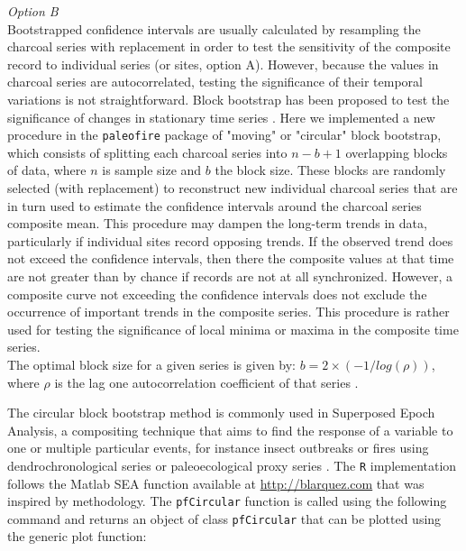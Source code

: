 \documentclass{elsarticle}
\begin{document}

\textit{Option B}\\
Bootstrapped confidence intervals are usually calculated by resampling the charcoal series with replacement in order to test the sensitivity of the composite record to individual series (or sites, option A). However, because the values in charcoal series are autocorrelated, testing the significance of their temporal variations is not straightforward. Block bootstrap has been proposed to test the significance of changes in stationary time series \citep{Kunsch1989}. Here we implemented a new procedure in the \texttt{paleofire} package of "moving" or "circular" block bootstrap, which consists of splitting each charcoal series into $n-b+1$ overlapping blocks of data, where $n$ is sample size and $b$ the block size. These blocks are randomly selected (with replacement) to reconstruct new individual charcoal series that are in turn used to estimate the confidence intervals around the charcoal series composite mean. This procedure may dampen the long-term trends in data, particularly if individual sites record opposing trends. If the observed trend does not exceed the confidence intervals, then there the composite values at that time are not greater than by chance if records are not at all synchronized. However, a composite curve not exceeding the confidence intervals does not exclude the occurrence of important trends in the composite series. This procedure is rather used for testing the significance of local minima or maxima in the composite time series. \\
The optimal block size for a given series is given by: $b=2\times(-1/log(\rho))$, where $\rho$ is the lag one autocorrelation coefficient of that series \citep{Adams2003}. 

The circular block bootstrap method is commonly used in Superposed Epoch Analysis, a compositing technique that aims to find the response of a variable to one or multiple particular events, for instance insect outbreaks \citep[e.g.]{Nola2006} or fires \citep[e.g.]{Swetnam1993} using dendrochronological series or paleoecological proxy series \citep{Blarquez2010a}. The \texttt{R} implementation follows the Matlab SEA function available at \url{http://blarquez.com} that was inspired by \citet{Adams2003} methodology. The \texttt{pfCircular} function is called using the following command and returns an object of class \texttt{pfCircular} that can be plotted using the generic plot function:
\end{document}
